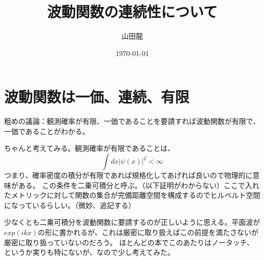 \documentclass{jsarticle}
\date{\today}
\author{山田龍}
\title{波動関数の連続性について}
\newcommand{\beq}{\begin{equation}}
\newcommand{\eeq}{\end{equation}}
\begin{document}
\maketitle
\section{波動関数は一価、連続、有限}
粗めの議論：観測確率が有限、一価であることを要請すれば波動関数が有限で、一価であることがわかる。

ちゃんと考えてみる。観測確率が有限であることは、
\beq
\int dx |\psi(x)|^2 < \infty
\eeq
つまり、確率密度の積分が有限であれば規格化してあげれば良いので物理的に意味がある。
この条件を二乗可積分と呼ぶ。（以下証明がわからない）ここで入れたメトリックに対して関数の集合が完備距離空間を構成するのでヒルベルト空間になっているらしい。（微妙、追記する）

少なくとも二乗可積分を波動関数に要請するのが正しいように思える。平面波が$exp(ikx)$の形に書かれるが、これは厳密に取り扱えばこの前提を満たさないが厳密に取り扱っていないのだろう。
ほとんどの本でこのあたりはノータッチ、というか実りも特にないが、なので少し考えてみた。
\end{document}

